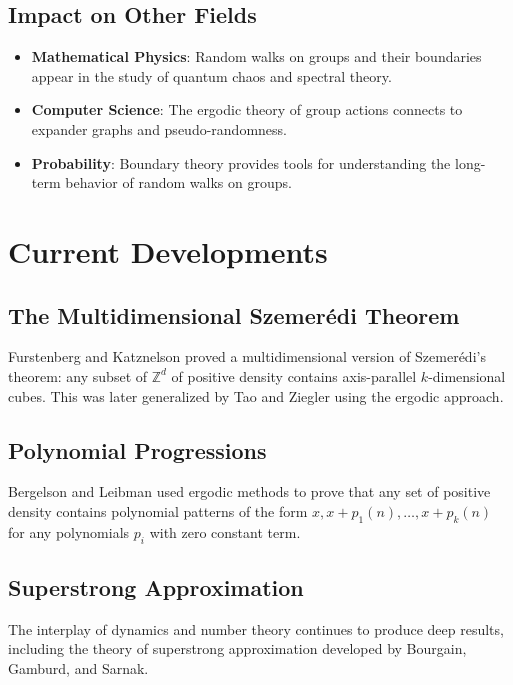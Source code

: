 \subsection{Impact on Other Fields}

\begin{itemize}
\item \textbf{Mathematical Physics}: Random walks on groups and their boundaries appear in the study of quantum chaos and spectral theory.
\item \textbf{Computer Science}: The ergodic theory of group actions connects to expander graphs and pseudo-randomness.
\item \textbf{Probability}: Boundary theory provides tools for understanding the long-term behavior of random walks on groups.
\end{itemize}

\section{Current Developments}

\subsection{The Multidimensional Szemer\'edi Theorem}

Furstenberg and Katznelson proved a multidimensional version of Szemer\'edi's theorem: any subset of $\mathbb{Z}^d$ of positive density contains axis-parallel $k$-dimensional cubes. This was later generalized by Tao and Ziegler using the ergodic approach.

\subsection{Polynomial Progressions}

Bergelson and Leibman used ergodic methods to prove that any set of positive density contains polynomial patterns of the form $x, x+p_1(n), \ldots, x+p_k(n)$ for any polynomials $p_i$ with zero constant term.

\subsection{Superstrong Approximation}

The interplay of dynamics and number theory continues to produce deep results, including the theory of superstrong approximation developed by Bourgain, Gamburd, and Sarnak.

